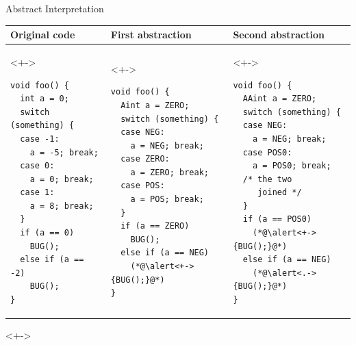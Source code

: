 \begin{frame}[fragile]{Abstract Interpretation}

  \begin{center}

  \smallskip

  \begin{tabular}{|l|l|l|} \hline
  Original code & First abstraction & Second abstraction \\ \hline
  \begin{uncoverenv}<+->
  \begin{lstlisting}
void foo() {
  int a = 0;
  switch (something) {
  case -1:
    a = -5; break;
  case 0:
    a = 0; break;
  case 1:
    a = 8; break;
  }
  if (a == 0)
    BUG();
  else if (a == -2)
    BUG();
}
  \end{lstlisting}
  \end{uncoverenv}
  &
  \begin{uncoverenv}<+->
  \begin{lstlisting}
void foo() {
  Aint a = ZERO;
  switch (something) {
  case NEG:
    a = NEG; break;
  case ZERO:
    a = ZERO; break;
  case POS:
    a = POS; break;
  }
  if (a == ZERO)
    BUG();
  else if (a == NEG)
    (*@\alert<+->{BUG();}@*)
}
  \end{lstlisting}
  \end{uncoverenv}
  &
  \begin{uncoverenv}<+->
  \begin{lstlisting}
void foo() {
  AAint a = ZERO;
  switch (something) {
  case NEG:
    a = NEG; break;
  case POS0:
    a = POS0; break;
  /* the two
     joined */
  }
  if (a == POS0)
    (*@\alert<+->{BUG();}@*)
  else if (a == NEG)
    (*@\alert<.->{BUG();}@*)
}
  \end{lstlisting}
  \end{uncoverenv}
  \\ \hline
  \end{tabular}
  \end{center}

  \smallskip

  \begin{uncoverenv}<+->
    \begin{center}
    \end{center}
  \end{uncoverenv}

\end{frame}

